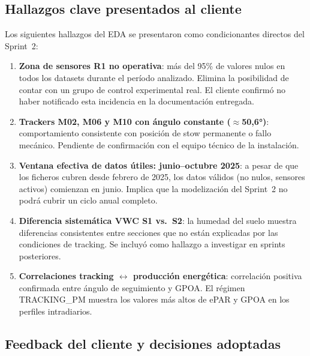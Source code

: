 \documentclass[12pt,a4paper]{article}
\begin{document}
\subsection{Hallazgos clave presentados al cliente}

Los siguientes hallazgos del EDA se presentaron como condicionantes directos del Sprint~2:

\begin{enumerate}
  \item \textbf{Zona de sensores R1 no operativa}: más del 95\% de valores nulos en todos los datasets durante el período analizado. Elimina la posibilidad de contar con un grupo de control experimental real. El cliente confirmó no haber notificado esta incidencia en la documentación entregada.
  \item \textbf{Trackers M02, M06 y M10 con ángulo constante ($\approx$50,6°)}: comportamiento consistente con posición de stow permanente o fallo mecánico. Pendiente de confirmación con el equipo técnico de la instalación.
  \item \textbf{Ventana efectiva de datos útiles: junio--octubre 2025}: a pesar de que los ficheros cubren desde febrero de 2025, los datos válidos (no nulos, sensores activos) comienzan en junio. Implica que la modelización del Sprint~2 no podrá cubrir un ciclo anual completo.
  \item \textbf{Diferencia sistemática VWC S1 vs.\ S2}: la humedad del suelo muestra diferencias consistentes entre secciones que no están explicadas por las condiciones de tracking. Se incluyó como hallazgo a investigar en sprints posteriores.
  \item \textbf{Correlaciones tracking $\leftrightarrow$ producción energética}: correlación positiva confirmada entre ángulo de seguimiento y GPOA. El régimen TRACKING\_PM muestra los valores más altos de ePAR y GPOA en los perfiles intradiarios.
\end{enumerate}

\subsection{Feedback del cliente y decisiones adoptadas}
\end{document}
